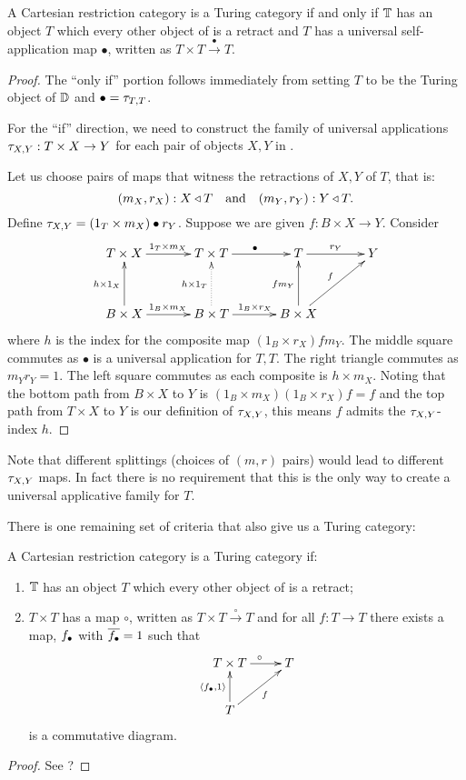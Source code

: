 \begin{theorem}\label{thm:turing_recognition}
  A Cartesian restriction category \D is a Turing category if and only if $\mathbb{T}$ has an object $T$
  which every other object of \D is a retract and $T$ has a universal self-application map
  $\bullet$, written as $T\times T \xrightarrow{\ \bullet\ }T$.
\end{theorem}
\begin{proof}
  The ``only if'' portion follows immediately from setting $T$ to be the Turing object of $\mathbb{D}$ and
  $\bullet = \tau_{{T},{T}}$.

  For the ``if'' direction, we need to construct the family of universal applications
  $\tau_{{X},{Y}} : T\times X \to Y$ for each pair of objects $X,Y$ in \D.

  Let us choose pairs of maps that witness the retractions of $X, Y$ of $T$, that is:
  \[
    (m_X,r_X):X \triangleleft T \quad\text{and}\quad(m_Y,r_Y):Y \triangleleft T.
  \]
  Define $\tau_{{X},{Y}} = (1_T\times m_X ) \bullet r_Y$. Suppose we are given $f:B\times X \to Y$. Consider
  \[
    \xymatrix@C+10pt@R+10pt{
      T \times X \ar[r]^{1_T\times m_X} & T\times T \ar[r]^{\bullet} & T \ar[r]^{r_Y} & Y \\
      B \times X \ar[r]^{1_B\times m_X} \ar[u]^{h\times 1_X}
        & B \times T \ar@{.>}[u]^{h\times 1_T} \ar[r]^{1_B \times r_X}
        & B \times X \ar[ur]^{f} \ar[u]^{f m_Y}
      }
  \]
  where $h$ is the index for the composite map $(1_B \times r_X) f m_Y$. The middle square commutes
  as $\bullet$ is a universal application for $T,T$. The right triangle commutes as $m_Y r_Y =1$.
  The left square commutes as each composite is $h \times m_X$. Noting that the bottom path from
  $B\times X$ to $Y$ is $(1_B \times m_X)(1_B \times r_X)f = f$ and the top path from $T\times X$ to
  $Y$ is our definition of $\tau_{{X},{Y}}$, this means $f$ admits the $\tau_{{X},{Y}}$-index $h$.
\end{proof}

Note that different splittings (choices of $(m,r)$ pairs) would lead to different $\tau_{{X},{Y}}$ maps. In
fact there is no requirement that this is the only way to create a universal applicative family
for $T$.

There is one remaining set of criteria that also give us a Turing category:

\begin{lemma}\label{lem:t_t_to_t_gives_a_turing_category}
  A Cartesian restriction category \T is a Turing category if:
  \begin{enumerate}[{(}i{)}]
  \item $\mathbb{T}$ has an object $T$ which every other object of \D is a retract;
  \item $T\times T$ has a map  $\circ$, written as $T\times T \xrightarrow{\ \circ\ }T$ and for all
    $f:T\to T$ there exists a map, $f_{\bullet}$ with  $\overline{f_{\bullet}} = 1$ such that
      \[
        \xymatrix{
          T\times T \ar[r]^{\circ} & T \\
          T \ar[ur]_{f} \ar[u]^{\<\name{f},1\>}
        }
      \]
    is a commutative diagram.
  \end{enumerate}
\end{lemma}
\begin{proof}
  See ?
\end{proof}
